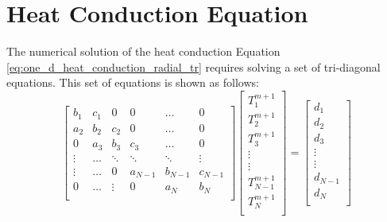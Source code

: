 \section{Heat Conduction Equation} \label{section:heat_cond_eq}
The numerical solution of the heat conduction Equation \ref{eq:one_d_heat_conduction_radial_tr}
requires solving a set of tri-diagonal equations. This set of equations is shown as follows:
\begin{equation}
    \label{eq:heat_cond_eq_tridiagonal}
    \begin{bmatrix}
        b_{1}   &   c_{1}   &   0       &  0        &   \dots     &   0         \\
        a_{2}   &   b_{2}   &   c_{2}   &  0        &   \dots     &   0         \\
        0       &   a_{3}   &   b_{3}   &  c_{3}    &   \dots     &   0         \\
        \vdots  &   \hdots  &   \ddots  &  \ddots   &   \ddots    &   \vdots    \\
        \vdots  &   \hdots  &   0       &  a_{N-1}  &   b_{N-1}   &   c_{N-1}   \\
        0       &   \hdots  &   \vdots  &   0       &   a_{N}     &     b_{N}   \\  
    \end{bmatrix}
    \begin{bmatrix}
        T_{1}^{m+1}         \\
        T_{2}^{m+1}         \\
        T_{3}^{m+1}         \\
        \vdots              \\
        \vdots              \\
        T_{N-1}^{m+1}       \\
        T_{N}^{m+1}         \\
    \end{bmatrix}
    =
    \begin{bmatrix}
        d_{1}               \\
        d_{2}               \\
        d_{3}               \\
        \vdots              \\
        \vdots              \\
        d_{N-1}             \\
        d_{N}               \\
    \end{bmatrix}
\end{equation}

